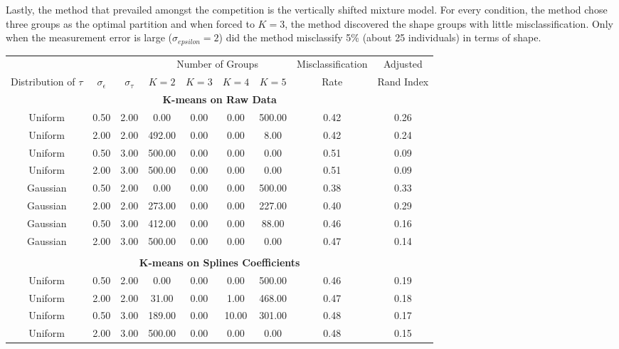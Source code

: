 Lastly, the method that prevailed amongst the competition is the vertically shifted mixture model. For every condition, the method chose three groups as the optimal partition and when forced to $K=3$, the method discovered the shape groups with little misclassification. Only when the measurement error is large ($\sigma_{epsilon}=2$) did the method misclassify 5\% (about 25 individuals) in terms of shape. \\ 

\begin{table}[ht]
\begin{center}
\begin{tabular}{ccc|cccccc}
  \hline &&&\multicolumn{4}{c}{Number of Groups}&Misclassification&Adjusted\\ Distribution of $\tau$&$\sigma_{\epsilon}$&$\sigma_{\tau}$&$K=2$&$K=3$&$K=4$&$K=5$&Rate&Rand Index\\ \hline\multicolumn{9}{c}{\textbf{K-means on Raw Data}}\\ Uniform & 0.50 & 2.00 & 0.00 & 0.00 & 0.00 & 500.00 & 0.42 & 0.26 \\ 
  Uniform & 2.00 & 2.00 & 492.00 & 0.00 & 0.00 & 8.00 & 0.42 & 0.24 \\ 
  Uniform & 0.50 & 3.00 & 500.00 & 0.00 & 0.00 & 0.00 & 0.51 & 0.09 \\ 
  Uniform & 2.00 & 3.00 & 500.00 & 0.00 & 0.00 & 0.00 & 0.51 & 0.09 \\ 
  Gaussian & 0.50 & 2.00 & 0.00 & 0.00 & 0.00 & 500.00 & 0.38 & 0.33 \\ 
  Gaussian & 2.00 & 2.00 & 273.00 & 0.00 & 0.00 & 227.00 & 0.40 & 0.29 \\ 
  Gaussian & 0.50 & 3.00 & 412.00 & 0.00 & 0.00 & 88.00 & 0.46 & 0.16 \\ 
  Gaussian & 2.00 & 3.00 & 500.00 & 0.00 & 0.00 & 0.00 & 0.47 & 0.14 \\ 
   \\ \multicolumn{9}{c}{\textbf{K-means on Splines Coefficients}}\\Uniform & 0.50 & 2.00 & 0.00 & 0.00 & 0.00 & 500.00 & 0.46 & 0.19 \\ 
  Uniform & 2.00 & 2.00 & 31.00 & 0.00 & 1.00 & 468.00 & 0.47 & 0.18 \\ 
  Uniform & 0.50 & 3.00 & 189.00 & 0.00 & 10.00 & 301.00 & 0.48 & 0.17 \\ 
  Uniform & 2.00 & 3.00 & 500.00 & 0.00 & 0.00 & 0.00 & 0.48 & 0.15 \\ 

\end{tabular}
\end{center}
\end{table}
